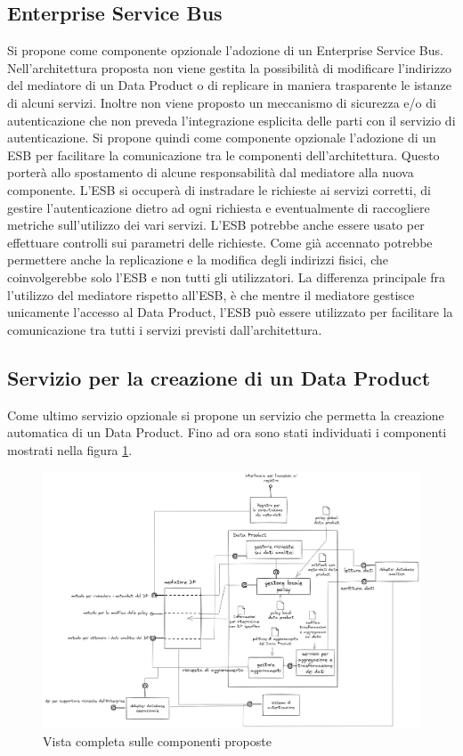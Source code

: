 \documentclass[12pt]{report}
\begin{document}
\subsection{Enterprise Service Bus}
Si propone come componente opzionale l'adozione di un Enterprise Service Bus.
Nell'architettura proposta non viene gestita la possibilità di modificare l'indirizzo del mediatore di un Data Product o di replicare in maniera trasparente le istanze di alcuni servizi.
Inoltre non viene proposto un meccanismo di sicurezza e/o di autenticazione che non preveda l'integrazione esplicita delle parti con il servizio di autenticazione.
Si propone quindi come componente opzionale l'adozione di un ESB per facilitare la comunicazione tra le componenti dell'architettura.
Questo porterà allo spostamento di alcune responsabilità dal mediatore alla nuova componente.
L'ESB si occuperà di instradare le richieste ai servizi corretti, di gestire l'autenticazione dietro ad ogni richiesta e  eventualmente di raccogliere metriche sull'utilizzo dei vari servizi.
L'ESB potrebbe anche essere usato per effettuare controlli sui parametri delle richieste.
Come già accennato potrebbe permettere anche la replicazione e la modifica degli indirizzi fisici, che coinvolgerebbe solo l'ESB e non tutti gli utilizzatori.
La differenza principale fra l'utilizzo del mediatore rispetto all'ESB, è che mentre il mediatore gestisce unicamente l'accesso al Data Product, l'ESB può essere utilizzato per facilitare la comunicazione tra tutti i servizi previsti dall'architettura.

\subsection{Servizio per la creazione di un Data Product}
Come ultimo servizio opzionale si propone un servizio che permetta la creazione automatica di un Data Product.
Fino ad ora sono stati individuati i componenti mostrati nella figura \ref{fig:architettura completa}.
\begin{figure}[H]
    \centering
    \includegraphics[width=\linewidth]{immagini/disegno completo architettura 2024-03-12 18.03.16.excalidraw.png}
    \caption{Vista completa sulle componenti proposte}
    \label{fig:architettura completa}
\end{figure}
\end{document}
